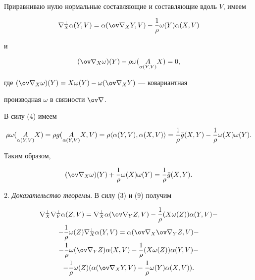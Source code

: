 Приравниваю нулю нормальные составляющие и составляющие вдоль $V$, имеем 


\begin{equation} 


\na^\bot_X\alpha(Y,V)=\alpha(\ov\na_XY,V)-\frac{1}{\rho}\omega 


(Y)\alpha(X,V) 


\end{equation} 


и 


$$ 


(\ov\na_X\omega)(Y)-\rho\omega(\underset{\alpha(Y,V)}{A}{}X)=0, 


$$ 


где $(\ov\na_X\omega)(Y)=X\omega(Y)-\omega(\ov\na_XY)$ --- ковариантная 


производная $\omega$ в связности $\ov\na$. 


 


В силу (4) имеем 


$$ 


\rho\omega(\underset{\alpha(Y,V)}{A}{}X)= 


\rho g(\underset{\alpha(Y,V)}{A}{}X,V)=\rho\la\alpha(Y,V),\alpha 


(X,V)\ra=\frac{1}{\rho}\Bar g(X,Y)-\frac{1}{\rho}\omega(X)\omega(Y). 


$$ 


 


Таким образом, 


\begin{equation} 


(\ov\na_X\omega)(Y)+\frac{1}{\rho}\omega(X)\omega(Y)= 


\frac{1}{\rho}\Bar g(X,Y). 


\end{equation} 


\medskip 


 


2. {\it Доказательство теоремы}. В силу (3) и (9) получим 


\begin{gather*} 


\na^\bot_X\na^\bot_Y\alpha(Z,V)=\na^\bot_X\alpha(\ov\na_YZ,V)- 


\frac{1}{\rho}(X\omega(Z))\alpha(Y,V)-\\ 


-\frac{1}{\rho}\omega(Z)\na^\bot_X\alpha(Y,V)= 


\alpha(\ov\na_X\ov\na_YZ,V)-\\ 


-\frac{1}{\rho}\omega(\ov\na_YZ)\alpha(X,V)- 


\frac{1}{\rho}(X\omega(Z))\alpha(Y,V)-\\ 


-\frac{1}{\rho}\omega(Z)(\alpha(\ov\na_XY,V)-\frac{1}{\rho} 


\omega(Y)\alpha(X,V)). 


\end{gather*} 


